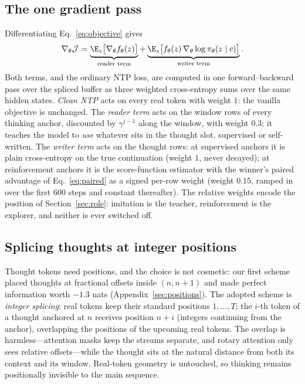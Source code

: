 \documentclass{article} %
\newcommand{\ctx}{c}
\newcommand{\thought}{z}
\newcommand{\policy}{\pi_\theta}
\begin{document}
\subsection{The one gradient pass}
\label{sec:losses}

Differentiating Eq.~\eqref{eq:objective} gives
\begin{equation}
    \nabla_\theta \mathcal{J}
    = \underbrace{\E_{\thought}\big[ \nabla_\theta f_\theta(\thought) \big]}_{\text{reader term}}
    + \underbrace{\E_{\thought}\big[ f_\theta(\thought)\, \nabla_\theta \log \policy(\thought \mid \ctx) \big]}_{\text{writer term}}.
    \label{eq:gradient}
\end{equation}
Both terms, and the ordinary NTP loss, are computed in one forward--backward pass over the spliced buffer as three weighted cross-entropy sums over the same hidden states. \emph{Clean NTP} acts on every real token with weight $1$: the vanilla objective is unchanged. The \emph{reader term} acts on the window rows of every thinking anchor, discounted by $\gamma^{j-1}$ along the window, with weight $0.3$; it teaches the model to \emph{use} whatever sits in the thought slot, supervised or self-written. The \emph{writer term} acts on the thought rows: at supervised anchors it is plain cross-entropy on the true continuation (weight $1$, never decayed); at reinforcement anchors it is the score-function estimator with the winner's paired advantage of Eq.~\eqref{eq:paired} as a signed per-row weight (weight $0.15$, ramped in over the first $600$ steps and constant thereafter). The relative weights encode the position of Section~\ref{sec:role}: imitation is the teacher, reinforcement is the explorer, and neither is ever switched off.

\subsection{Splicing thoughts at integer positions}
\label{sec:splice}

Thought tokens need positions, and the choice is not cosmetic: our first scheme placed thoughts at fractional offsets inside $(n, n{+}1)$ and made perfect information worth $-1.3$ nats (Appendix~\ref{sec:positions}). The adopted scheme is \emph{integer splicing}: real tokens keep their standard positions $1,\dots,T$; the $i$-th token of a thought anchored at $n$ receives position $n + i$ (integers continuing from the anchor), overlapping the positions of the upcoming real tokens. The overlap is harmless---attention masks keep the streams separate, and rotary attention only sees relative offsets---while the thought sits at the natural distance from both its context and its window. Real-token geometry is untouched, so thinking remains positionally invisible to the main sequence.
\end{document}
